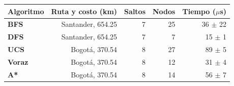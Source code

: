 \renewcommand{\arraystretch}{1.2}
\begin{tabular}{|l|r|r|r|r|}
\hline
\rowcolor{gray!20} \textbf{Algoritmo} & \textbf{Ruta y costo (km)} & \textbf{Saltos} & \textbf{Nodos} & \textbf{Tiempo ($\mu$s)} \\
\hline
\textbf{BFS} & Santander, 654.25 & 7 & 25 & 36 $\pm$ 22 \\
\hline
\textbf{DFS} & Santander, 654.25 & 7 & 7 & 15 $\pm$ 1 \\
\hline
\textbf{UCS} & Bogotá, 370.54 & 8 & 27 & 89 $\pm$ 5 \\
\hline
\textbf{Voraz} & Bogotá, 370.54 & 8 & 12 & 31 $\pm$ 4 \\
\hline
\textbf{A*} & Bogotá, 370.54 & 8 & 14 & 56 $\pm$ 7 \\
\hline
\end{tabular}

